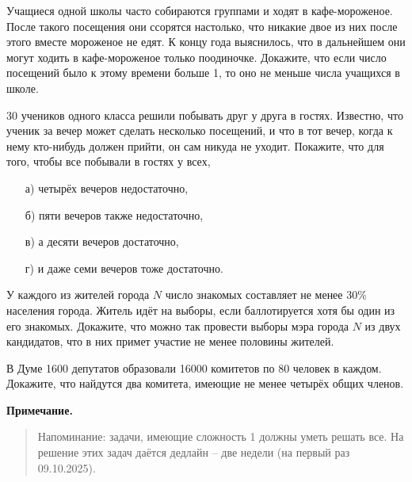 \documentclass{article}
\begin{document}
\begin{task}[3]
Учащиеся одной школы часто собираются группами и ходят в кафе-мороженое. После такого посещения они ссорятся настолько, что никакие двое из них после этого вместе мороженое не едят. К концу года выяснилось, что в дальнейшем они могут ходить в кафе-мороженое только поодиночке. Докажите, что если число посещений было к этому времени больше 1, то оно не меньше числа учащихся в школе.
\end{task}

\begin{task}[3]
30 учеников одного класса решили побывать друг у друга в гостях. Известно, что ученик за вечер может сделать несколько посещений, и что в тот вечер, когда к нему кто-нибудь должен прийти, он сам никуда не уходит. Покажите, что для того, чтобы все побывали в гостях у всех,
\begin{enumerate}
    \item[а)] четырёх вечеров недостаточно,
    \item[б)] пяти вечеров также недостаточно,
    \item[в)] а десяти вечеров достаточно,
    \item[г)] и даже семи вечеров тоже достаточно.
\end{enumerate}
\end{task}

\begin{task}[3]
У каждого из жителей города $N$ число знакомых составляет не менее 30\% населения города. Житель идёт на выборы, если баллотируется хотя бы один из его знакомых. Докажите, что можно так провести выборы мэра города $N$ из двух кандидатов, что в них примет участие не менее половины жителей.
\end{task}

\begin{task}[3]
В Думе 1600 депутатов образовали 16000 комитетов по 80 человек в каждом. Докажите, что найдутся два комитета, имеющие не менее четырёх общих членов.
\end{task}

\vspace{1.5em}
\noindent\textbf{Примечание.}
\begin{quote}
Напоминание: задачи, имеющие сложность 1 должны уметь решать все. На решение этих задач даётся дедлайн – две недели (на первый раз 09.10.2025).
\end{quote}
\end{document}
